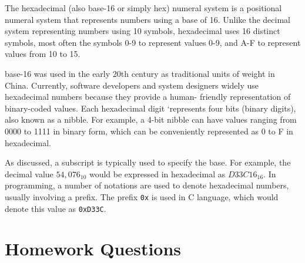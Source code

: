 The hexadecimal (also \gls{base-16} or simply hex) numeral system is a positional numeral system that 
represents numbers using a base of 16. Unlike the decimal system representing numbers using 10 symbols, hexadecimal uses 16 distinct symbols, most often the symbols 0-9 to represent values 0-9, and A-F to 
represent values from 10 to 15. 

\Gls{base-16} was used in the early 20th century as traditional units of weight in China. %
Currently, software developers and system designers widely use hexadecimal numbers because they provide a human-
friendly representation of binary-coded values. Each hexadecimal digit `represents four bits (binary digits), 
also known as a \gls{nibble}. For example, a 4-bit nibble can have values ranging from 0000 to 1111 in 
binary form, which can be conveniently represented as 0 to F in hexadecimal.

As discussed, a subscript is typically used to specify the base. For example, the decimal value $54,076_{10}$
would be expressed in hexadecimal as $D33C16_{16}$. In programming, a number of notations are used to denote
hexadecimal numbers, usually involving a prefix. The prefix \texttt{0x} is used in C language, which would 
denote this value as \texttt{0xD33C}.


\vfill\clearpage
\section*{Homework Questions}


